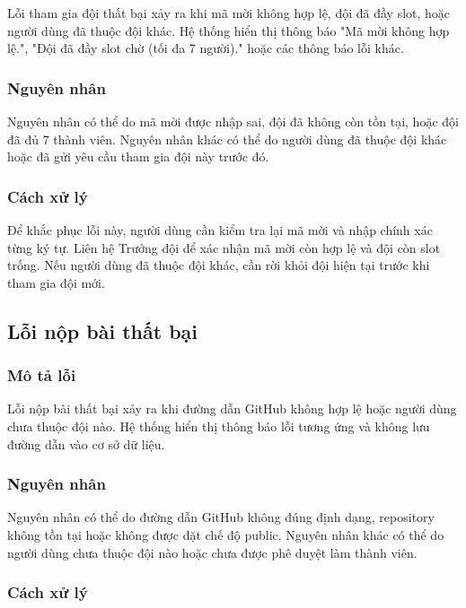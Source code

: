 Lỗi tham gia đội thất bại xảy ra khi mã mời không hợp lệ, đội đã đầy slot, hoặc người dùng đã thuộc đội khác. Hệ thống hiển thị thông báo "Mã mời không hợp lệ.", "Đội đã đầy slot chờ (tối đa 7 người)." hoặc các thông báo lỗi khác.

\subsubsection{Nguyên nhân}

Nguyên nhân có thể do mã mời được nhập sai, đội đã không còn tồn tại, hoặc đội đã đủ 7 thành viên. Nguyên nhân khác có thể do người dùng đã thuộc đội khác hoặc đã gửi yêu cầu tham gia đội này trước đó.

\subsubsection{Cách xử lý}

Để khắc phục lỗi này, người dùng cần kiểm tra lại mã mời và nhập chính xác từng ký tự. Liên hệ Trưởng đội để xác nhận mã mời còn hợp lệ và đội còn slot trống. Nếu người dùng đã thuộc đội khác, cần rời khỏi đội hiện tại trước khi tham gia đội mới.

\subsection{Lỗi nộp bài thất bại}

\subsubsection{Mô tả lỗi}

Lỗi nộp bài thất bại xảy ra khi đường dẫn GitHub không hợp lệ hoặc người dùng chưa thuộc đội nào. Hệ thống hiển thị thông báo lỗi tương ứng và không lưu đường dẫn vào cơ sở dữ liệu.

\subsubsection{Nguyên nhân}

Nguyên nhân có thể do đường dẫn GitHub không đúng định dạng, repository không tồn tại hoặc không được đặt chế độ public. Nguyên nhân khác có thể do người dùng chưa thuộc đội nào hoặc chưa được phê duyệt làm thành viên.

\subsubsection{Cách xử lý}

